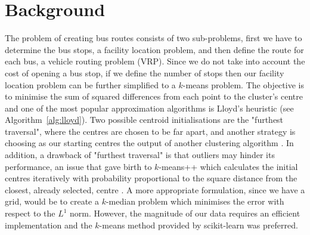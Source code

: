 \documentclass{article}
\begin{document}
\section{Background}

The problem of creating bus routes consists of two sub-problems, first we have to determine the bus stops, a facility location problem, and then define the route for each bus, a vehicle routing problem (VRP). Since we do not take into account the cost of opening a bus stop, if we define the number of stops then our facility location problem can be further simplified to a $k$-means problem. The objective is to minimise the sum of squared differences from each point to the cluster's centre and one of the most popular \citep{ostrovsky_effectiveness_2006} approximation algorithms is Lloyd's heuristic \citep{lloyd_least_1982} (see Algorithm~\ref{alg:lloyd}). Two possible centroid initialisations are the "furthest traversal", where the centres are chosen to be far apart, and another strategy is choosing as our starting centres the output of another clustering algorithm \citep[p. 214]{blum_foundations_2018}. In addition, a drawback of "furthest traversal" is that outliers may hinder its performance, an issue that gave birth to $k$-means++ which calculates the initial centres iteratively with probability proportional to the square distance from the closest, already selected, centre \citep{arthur_k-means++:_2007}. A more appropriate formulation, since we have a grid, would be to create a $k$-median problem which minimises the error with respect to the $L^1$ norm. However, the magnitude of our data requires an efficient implementation and the $k$-means method provided by scikit-learn \citep{pedregosa_scikit-learn:_2011} was preferred.
\end{document}
